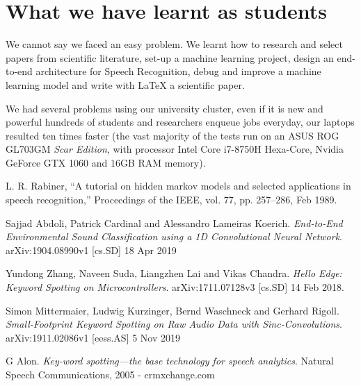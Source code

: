 \documentclass[conference]{IEEEtran}
\begin{document}
\section*{What we have learnt as students}
We cannot say we faced an easy problem. We learnt how to research and select papers from scientific literature, set-up a machine learning project, design an end-to-end architecture for Speech Recognition, debug and improve a machine learning model and write with \LaTeX\xspace a scientific paper.

We had several problems using our university cluster, even if it is new and powerful hundreds of students and researchers enqueue jobs everyday, our laptops resulted ten times faster (the vast majority of the tests run on an ASUS ROG GL703GM \textit{Scar Edition}, with processor Intel Core i7-8750H Hexa-Core, Nvidia  GeForce GTX 1060 and 16GB RAM memory).

\begin{thebibliography}{1}
L. R. Rabiner, “A tutorial on hidden markov models and selected applications in speech recognition,” Proceedings of the IEEE, vol. 77, pp. 257–286, Feb 1989.

Sajjad Abdoli, Patrick Cardinal and Alessandro Lameiras Koerich. \textit{End-to-End Environmental Sound Classification using a 1D Convolutional Neural Network}. arXiv:1904.08990v1 [cs.SD] 18 Apr 2019

Yundong Zhang, Naveen Suda, Liangzhen Lai and Vikas Chandra. \textit{Hello Edge: Keyword Spotting on Microcontrollers}. arXiv:1711.07128v3 [cs.SD] 14 Feb 2018.

Simon Mittermaier, Ludwig Kurzinger, Bernd Waschneck and Gerhard Rigoll. \textit{Small-Footprint Keyword Spotting on Raw Audio Data with Sinc-Convolutions}. arXiv:1911.02086v1 [eess.AS] 5 Nov 2019

G Alon. \textit{Key-word spotting—the base technology for speech analytics}. Natural Speech Communications, 2005 - crmxchange.com
\end{thebibliography}
\end{document}
